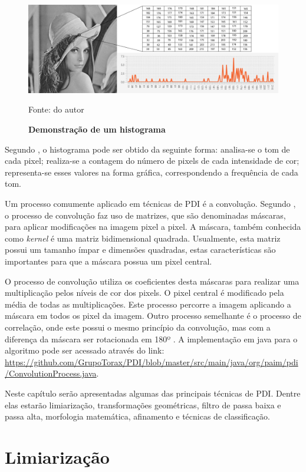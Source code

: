 \documentclass[
	12pt,				%
	oneside,			%
	a4paper,			%
	english,			%
	french,				%
	spanish,			%
	brazil,				%
	]{abntex2}
\begin{document}
\begin{figure}[ht]
\centering
\caption{\textbf{Demonstração de um histograma}}
\includegraphics[width=1\textwidth]{imagens/histograma.png}
\label{fig:histograma}

Fonte: do autor
\end{figure}


Segundo \citet{conciAzevedoLeta:2008}, o histograma pode ser obtido da seguinte forma: analisa-se o tom de cada pixel; realiza-se a contagem do número de pixels de cada intensidade de cor; representa-se esses valores na forma gráfica, correspondendo a frequência de cada tom.

Um processo comumente aplicado em técnicas de PDI é a convolução. Segundo \citet{pedriniSchwartz:2008}, o processo de convolução faz uso de matrizes, que são denominadas máscaras, para aplicar modificações na imagem pixel a pixel. A máscara, também conhecida como \textit{kernel} é uma matriz bidimensional quadrada. Usualmente, esta matriz possui um tamanho ímpar e dimensões quadradas, estas características são importantes para que a máscara possua um pixel central.

O processo de convolução utiliza os coeficientes desta máscaras para realizar uma multiplicação pelos níveis de cor dos pixels. O pixel central é modificado pela média de todas as multiplicações. Este processo percorre a imagem aplicando a máscara em todos os pixel da imagem. Outro processo semelhante é o processo de correlação, onde este possui o mesmo princípio da convolução, mas com a diferença da máscara ser rotacionada em 180º \cite{gonzalesWoods:2008}. A implementação em java para o algoritmo pode ser acessado através do link: \url{https://github.com/GrupoTorax/PDI/blob/master/src/main/java/org/paim/pdi/ConvolutionProcess.java}.

Neste capítulo serão apresentadas algumas das principais técnicas de PDI. Dentre elas estarão limiarização, transformações geométricas, filtro de passa baixa e passa alta, morfologia matemática, afinamento e técnicas de classificação.
\section{Limiarização}
\label{sec:limiarizacao}
\end{document}
